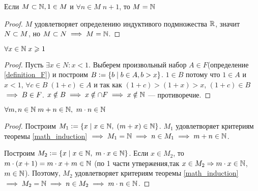 \begin{theorem} \label{math_induction}
    Если $ M \subset \mathbb{N}, 1 \in M $ и $ \forall n \in M \; n + 1 $, то $ M = \mathbb{N} $
\end{theorem} \begin{proof}
    $ M $ удовлетворяет определению индуктивого подмножества $ \mathbb{R} $, значит $ N \subset M $, но $ M \subset N \implies M = \mathbb{N}$.
\end{proof}
\begin{theorem}
    $ \forall x \in \mathbb{N} \; x \geqslant 1 $
\end{theorem}
\begin{proof}
    Пусть $\exists x \in N : x < 1$. Выберем произвольный набор $A \in F$(определение \ref{definition_F}) и построим $B \vcentcolon= \{b \;\vert\; b \in A, b > x\}$. $1 \in B$ потому что $1 \in A$ и $x < 1$, $\forall c \in B \; (1 + c) \in A$ и так как $(1 + c) > (1 + x) > x$, $(1 + c) \in B$ $\implies B \in F$. $x \notin B \implies x \notin \cap F \implies  x \notin \mathbb{N}$ --- противоречие.
\end{proof}
\begin{theorem}
    $ \forall m, n \in \mathbb{N} \; m + n \in \mathbb{N},\ m \cdot n \in \mathbb{N}$
\end{theorem}
\begin{proof}
    Построим $M_1 \vcentcolon= \{x \;\vert\; x \in \mathbb{N},\; (m + x) \in \mathbb{N}\}$. $M_1$ удовлетворяет критериям теоремы \ref{math_induction} $\implies M_1 = \mathbb{N} \implies n \in M_1 \implies m + n \in \mathbb{N}$.

    Построим $M_2 \vcentcolon= \{x \;\vert\; x \in \mathbb{N},\; m \cdot x \in \mathbb{N}\}$. Если $x \in M_2$, то $m \cdot (x + 1) = m \cdot x + m \in \mathbb{N}$ (по 1 части утвержения,так $x \in M_2 \Rightarrow m \cdot x \in \mathbb{N}$, $m \in \mathbb{N}$). Поэтому, $M_2$ удовлетворяет критериям теоремы \ref{math_induction} $\implies M_2 = \mathbb{N} \implies n \in M_2 \implies m \cdot n \in \mathbb{N}$.
\end{proof}